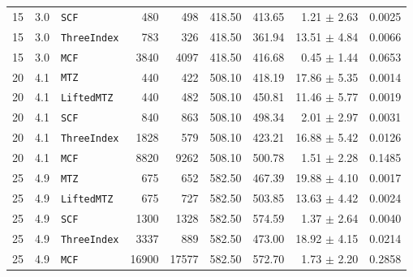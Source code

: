 \documentclass[11pt,a4paper]{article}
\begin{document}
\begin{table}[htbp]
\begin{tabular}{rrlrrrrrr}
15 & 3.0 & \texttt{SCF} & 480 & 498 & 418.50 & 413.65 & 1.21 $\pm$ 2.63 & 0.0025 \\
15 & 3.0 & \texttt{ThreeIndex} & 783 & 326 & 418.50 & 361.94 & 13.51 $\pm$ 4.84 & 0.0066 \\
15 & 3.0 & \texttt{MCF} & 3840 & 4097 & 418.50 & 416.68 & 0.45 $\pm$ 1.44 & 0.0653 \\
\midrule
20 & 4.1 & \texttt{MTZ} & 440 & 422 & 508.10 & 418.19 & 17.86 $\pm$ 5.35 & 0.0014 \\
20 & 4.1 & \texttt{LiftedMTZ} & 440 & 482 & 508.10 & 450.81 & 11.46 $\pm$ 5.77 & 0.0019 \\
20 & 4.1 & \texttt{SCF} & 840 & 863 & 508.10 & 498.34 & 2.01 $\pm$ 2.97 & 0.0031 \\
20 & 4.1 & \texttt{ThreeIndex} & 1828 & 579 & 508.10 & 423.21 & 16.88 $\pm$ 5.42 & 0.0126 \\
20 & 4.1 & \texttt{MCF} & 8820 & 9262 & 508.10 & 500.78 & 1.51 $\pm$ 2.28 & 0.1485 \\
\midrule
25 & 4.9 & \texttt{MTZ} & 675 & 652 & 582.50 & 467.39 & 19.88 $\pm$ 4.10 & 0.0017 \\
25 & 4.9 & \texttt{LiftedMTZ} & 675 & 727 & 582.50 & 503.85 & 13.63 $\pm$ 4.42 & 0.0024 \\
25 & 4.9 & \texttt{SCF} & 1300 & 1328 & 582.50 & 574.59 & 1.37 $\pm$ 2.64 & 0.0040 \\
25 & 4.9 & \texttt{ThreeIndex} & 3337 & 889 & 582.50 & 473.00 & 18.92 $\pm$ 4.15 & 0.0214 \\
25 & 4.9 & \texttt{MCF} & 16900 & 17577 & 582.50 & 572.70 & 1.73 $\pm$ 2.20 & 0.2858 \\
\bottomrule
\end{tabular}
\end{table}
\end{document}

